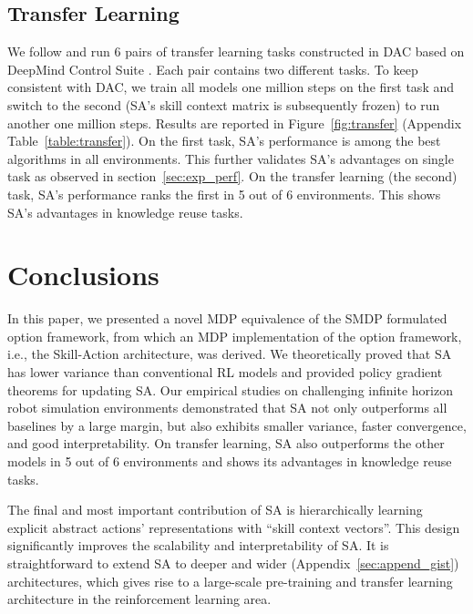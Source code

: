 \subsection{Transfer Learning}
\label{sec:transfer}

We follow  and run 6 pairs of transfer
learning tasks constructed in DAC based on DeepMind Control Suite
\cite{tassa2020dmcontrol}. Each pair contains two different
tasks. To keep consistent with DAC, we train all models one
million steps on the first task and switch to the second (SA's
skill context matrix is subsequently frozen) to run another one
million steps. Results are reported in Figure~\ref{fig:transfer}
(Appendix Table~\ref{table:transfer}). On the first task, SA's
performance is among the best algorithms in all environments.
This further validates SA's advantages on single task as observed
in section~\ref{sec:exp_perf}. On the transfer learning (the
second) task, SA's performance ranks the first in 5 out of 6
environments. This shows SA's advantages in knowledge reuse
tasks. \vspace{-2mm}

\section{Conclusions}
\label{sec:conclusion}
\vspace{-2mm}

In this paper, we presented a novel MDP equivalence of the SMDP
formulated option framework, from which an MDP implementation of
the option framework, i.e., the Skill-Action architecture, was
derived. We theoretically proved that SA has lower variance than
conventional RL models and provided policy gradient theorems for
updating SA. Our empirical studies on challenging infinite
horizon robot simulation environments demonstrated that SA not
only outperforms all baselines by a large margin, but also
exhibits smaller variance, faster convergence, and good
interpretability. On transfer learning, SA also outperforms the
other models in 5 out of 6 environments and shows its advantages
in knowledge reuse tasks.

The final and most important contribution of SA is hierarchically
learning explicit abstract actions' representations with ``skill
context vectors''. This design significantly improves the
scalability and interpretability of SA. It is straightforward to
extend SA to deeper and wider (Appendix~\ref{sec:append_gist})
architectures, which gives rise to a large-scale pre-training and
transfer learning architecture in the reinforcement learning
area.

